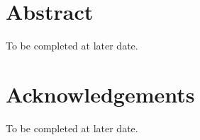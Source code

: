 \documentclass[12pt]{article}
\begin{document}
\section*{Abstract}

{\color{red} To be completed at later date.} 
\pagebreak





\section*{Acknowledgements}

{\color{red} To be completed at later date.} 







\pagebreak
\tableofcontents

\pagebreak
\listoffigures






\pagebreak










\end{document}
